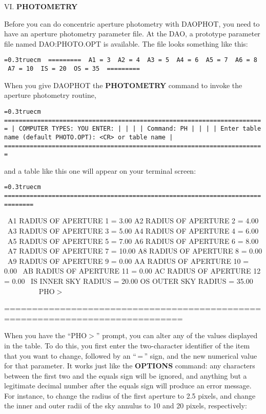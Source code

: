 \vfill
\eject
\noindent VI.  {\bf PHOTOMETRY}

Before you can do concentric aperture photometry with DAOPHOT, you
need to have an aperture photometry parameter file.  At the DAO, a
prototype parameter file named DAO:PHOTO.OPT is available.  The 
file looks something like this: 

\bigskip
{\obeylines\obeyspaces\frenchspacing\tt\baselineskip=0.3truecm
\     =========
\      A1 = 3
\      A2 = 4
\      A3 = 5
\      A4 = 6
\      A5 = 7
\      A6 = 8
\      A7 = 10
\      IS = 20
\      OS = 35
\     =========
}
\bigskip

\noindent When you give DAOPHOT the {\bf PHOTOMETRY} command to invoke the 
aperture photometry routine,

\bigskip
{\noindent\obeylines\obeyspaces\frenchspacing\tt\baselineskip=0.3truecm
=======================================================================
| COMPUTER TYPES:                                  YOU ENTER:         |
|                                                                     |
| Command:                                         PH                 |
|                                                                     |
|       Enter table name (default PHOTO.OPT):      <CR> or table name |
=======================================================================
}
\bigskip

\noindent and a table like this one will appear on your terminal screen:

\bigskip
{\noindent\obeylines\obeyspaces\frenchspacing\tt\baselineskip=0.3truecm
==============================================================================

\ A1  RADIUS OF APERTURE  1 =     3.00    A2  RADIUS OF APERTURE  2 =     4.00
\ A3  RADIUS OF APERTURE  3 =     5.00    A4  RADIUS OF APERTURE  4 =     6.00
\ A5  RADIUS OF APERTURE  5 =     7.00    A6  RADIUS OF APERTURE  6 =     8.00
\ A7  RADIUS OF APERTURE  7 =    10.00    A8  RADIUS OF APERTURE  8 =     0.00
\ A9  RADIUS OF APERTURE  9 =     0.00    AA  RADIUS OF APERTURE 10 =     0.00
\ AB  RADIUS OF APERTURE 11 =     0.00    AC  RADIUS OF APERTURE 12 =     0.00
\ IS       INNER SKY RADIUS =    20.00    OS       OUTER SKY RADIUS =    35.00
~~~~~~~~
\ PHO$>$

==============================================================================
}
\bigskip

When you have the ``PHO$>$'' prompt, you can alter any of the values
displayed in the table.  To do this, you first enter the two-character
identifier of the item that you want to change, followed by an
``$\,$=$\,$'' sign, and the new numerical value for that parameter.  It
works just like the {\bf OPTIONS} command:  any characters between the
first two and the equals sign will be ignored, and anything but a
legitimate decimal number after the equals sign will produce an error
message.  For instance, to change the radius of the first aperture to
2.5 pixels, and change the inner and outer radii of the sky annulus to
10 and 20 pixels, respectively:

